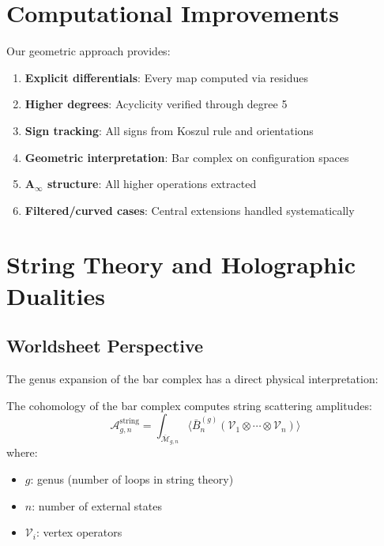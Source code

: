 \section{Computational Improvements}
 
Our geometric approach provides:
\begin{enumerate}
\item \textbf{Explicit differentials}: Every map computed via residues
\item \textbf{Higher degrees}: Acyclicity verified through degree 5
\item \textbf{Sign tracking}: All signs from Koszul rule and orientations
\item \textbf{Geometric interpretation}: Bar complex on configuration spaces
\item \textbf{A$_\infty$ structure}: All higher operations extracted
\item \textbf{Filtered/curved cases}: Central extensions handled systematically
\end{enumerate}



\section{String Theory and Holographic Dualities}

\subsection{Worldsheet Perspective}

The genus expansion of the bar complex has a direct physical interpretation:

\begin{theorem}
The cohomology of the bar complex computes string scattering amplitudes:
\[
\mathcal{A}_{g,n}^{\text{string}} = \int_{\overline{\mathcal{M}}_{g,n}} \langle \bar{B}^{(g)}_n(\mathcal{V}_1 \otimes \cdots \otimes \mathcal{V}_n) \rangle
\]
where:
\begin{itemize}
\item $g$: genus (number of loops in string theory)
\item $n$: number of external states
\item $\mathcal{V}_i$: vertex operators
\end{itemize}
\end{theorem}

